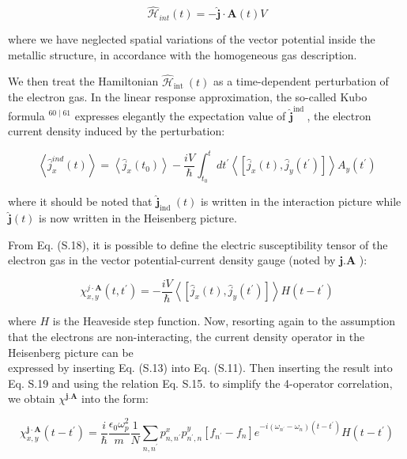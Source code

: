 \documentclass[10pt]{article}
\begin{document}
\begin{equation*}
\hat{\mathcal{H}}_{i n t}(t)=-\hat{\boldsymbol{j}} \cdot \boldsymbol{A}(t) V \tag{S.17}
\end{equation*}


where we have neglected spatial variations of the vector potential inside the metallic structure, in accordance with the homogeneous gas description.

We then treat the Hamiltonian $\hat{\mathcal{H}}_{\text {int }}(t)$ as a time-dependent perturbation of the electron gas. In the linear response approximation, the so-called Kubo formula ${ }^{60 \mid 61}$ expresses elegantly the expectation value of $\hat{\boldsymbol{j}}^{\text {ind }}$, the electron current density induced by the perturbation:


\begin{equation*}
\left\langle\hat{j}_{x}^{i n d}(t)\right\rangle=\left\langle\hat{j}_{x}\left(t_{0}\right)\right\rangle-\frac{i V}{\hbar} \int_{t_{0}}^{t} d t^{\prime}\left\langle\left[\hat{j}_{x}(t), \hat{j}_{y}\left(t^{\prime}\right)\right]\right\rangle A_{y}\left(t^{\prime}\right) \tag{S.18}
\end{equation*}


where it should be noted that $\hat{\boldsymbol{j}}_{\text {ind }}(t)$ is written in the interaction picture while $\hat{\boldsymbol{j}}(t)$ is now written in the Heisenberg picture.

From Eq. (S.18), it is possible to define the electric susceptibility tensor of the electron gas in the vector potential-current density gauge (noted by $\boldsymbol{j} . \boldsymbol{A}$ ):


\begin{equation*}
\chi_{x, y}^{j \cdot \boldsymbol{A}}\left(t, t^{\prime}\right)=-\frac{i V}{\hbar}\left\langle\left[\hat{j}_{x}(t), \hat{j}_{y}\left(t^{\prime}\right)\right]\right\rangle H\left(t-t^{\prime}\right) \tag{S.19}
\end{equation*}


where $H$ is the Heaveside step function. Now, resorting again to the assumption that the electrons are non-interacting, the current density operator in the Heisenberg picture can be\\
expressed by inserting Eq. (S.13) into Eq. (S.11). Then inserting the result into Eq. S.19 and using the relation Eq. S.15. to simplify the 4-operator correlation, we obtain $\chi^{\boldsymbol{j} . \boldsymbol{A}}$ into the form:


\begin{equation*}
\chi_{x, y}^{\boldsymbol{j} \cdot \boldsymbol{A}}\left(t-t^{\prime}\right)=\frac{i}{\hbar} \frac{\epsilon_{0} \omega_{p}^{2}}{m} \frac{1}{N} \sum_{n, n^{\prime}} p_{n, n^{\prime}}^{x} p_{n^{\prime}, n}^{y}\left[f_{n^{\prime}}-f_{n}\right] e^{-i\left(\omega_{n^{\prime}}-\omega_{n}\right)\left(t-t^{\prime}\right)} H\left(t-t^{\prime}\right) \tag{S.20}
\end{equation*}
\end{document}
